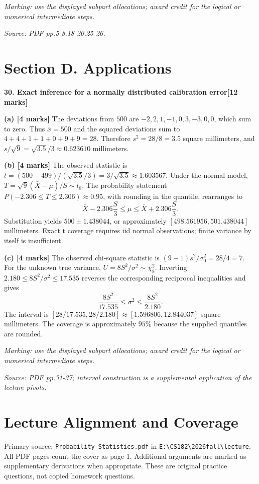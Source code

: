 \documentclass[11pt,a4paper]{article}
\begin{document}
\textit{Marking: use the displayed subpart allocations; award credit for the logical or numerical intermediate steps.}\par
{\footnotesize\textit{Source: PDF pp.5-8,18-20,25-26.}}
\newpage\section*{Section D. Applications}
\textbf{30. Exact inference for a normally distributed calibration error}\hfill\textbf{[12 marks]}\par\medskip
\textbf{(a) [4 marks]} The deviations from \(500\) are \(-2,2,1,-1,0,3,-3,0,0\), which sum to zero. Thus \(\bar x=500\) and the squared deviations sum to \(4+4+1+1+0+9+9=28\). Therefore \(s^2=28/8=3.5\) square millimeters, and \(s/\sqrt9=\sqrt{3.5}/3\approx0.623610\) millimeters.

\textbf{(b) [4 marks]} The observed statistic is \(t=(500-499)/(\sqrt{3.5}/3)=3/\sqrt{3.5}\approx1.603567\). Under the normal model, \(T=\sqrt9(\bar X-\mu)/S\sim t_8\). The probability statement \(P(-2.306\le T\le2.306)\approx0.95\), with rounding in the quantile, rearranges to \[\bar X-2.306\frac{S}{3}\le\mu\le\bar X+2.306\frac{S}{3}.\] Substitution yields \(500\pm1.438044\), or approximately \([498.561956,501.438044]\) millimeters. Exact t coverage requires iid normal observations; finite variance by itself is insufficient.

\textbf{(c) [4 marks]} The observed chi-square statistic is \((9-1)s^2/\sigma_0^2=28/4=7\). For the unknown true variance, \(U=8S^2/\sigma^2\sim\chi^2_8\). Inverting \(2.180\le8S^2/\sigma^2\le17.535\) reverses the corresponding reciprocal inequalities and gives \[\frac{8S^2}{17.535}\le\sigma^2\le\frac{8S^2}{2.180}.\] The interval is \([28/17.535,28/2.180]\approx[1.596806,12.844037]\) square millimeters. The coverage is approximately \(95\%\) because the supplied quantiles are rounded.

\textit{Marking: use the displayed subpart allocations; award credit for the logical or numerical intermediate steps.}\par
{\footnotesize\textit{Source: PDF pp.31-37; interval construction is a supplemental application of the lecture pivots.}}
\newpage\section*{Lecture Alignment and Coverage}
Primary source: \texttt{Probability\_Statistics.pdf} in \texttt{E:\textbackslash CS182\textbackslash 2026fall\textbackslash lecture}. All PDF pages count the cover as page 1. Additional arguments are marked as supplementary derivations when appropriate. These are original practice questions, not copied homework questions.
\end{document}
